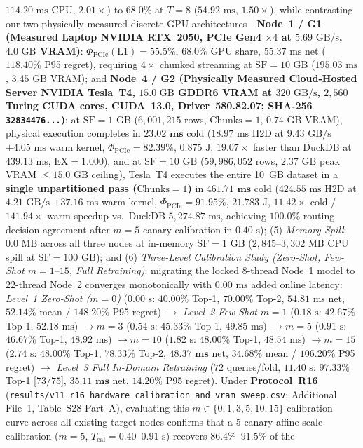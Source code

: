 \documentclass[10pt,a4paper]{article}
\begin{document}
\begin{enumerate}[leftmargin=1.5em,itemsep=0.8pt]
$114.20\text{ ms}$ CPU, $2.01\times$) to $68.0\%$ at $T=8$ ($54.92\text{ ms}$, $1.50\times$), while contrasting our two physically measured discrete GPU architectures---\textbf{Node~1 / G1 (Measured Laptop NVIDIA RTX~2050, PCIe Gen4 $\times 4$ at $5.69\text{ GB/s}$, $4.0\text{ GB}$ VRAM)}: $\Phi_{\text{PCIe}}(\text{L1})=55.5\%$, $68.0\%$ GPU share, $55.37\text{ ms}$ net ($118.40\%$ P95 regret), requiring $4\times$ chunked streaming at $\text{SF}=10\text{ GB}$ ($195.03\text{ ms}$, $3.45\text{ GB}$ VRAM); and \textbf{Node~4 / G2 (Physically Measured Cloud-Hosted Server NVIDIA Tesla~T4, $15.0\text{ GB}$ GDDR6 VRAM at $320\text{ GB/s}$, $2{,}560$ Turing CUDA cores, CUDA~13.0, Driver~580.82.07; SHA-256 \texttt{32834476...})}: at $\text{SF}=1\text{ GB}$ ($6{,}001{,}215$ rows, $\text{Chunks}=1$, $0.74\text{ GB}$ VRAM), physical execution completes in $\mathbf{23.02\text{ ms}}$ cold ($18.97\text{ ms}$ H2D at $9.43\text{ GB/s}$ $+ 4.05\text{ ms}$ warm kernel, $\Phi_{\text{PCIe}}=82.39\%$, $0.875\text{ J}$, $\mathbf{19.07\times}$ faster than DuckDB at $439.13\text{ ms}$, $\text{EX}=1.000$), and at $\text{SF}=10\text{ GB}$ ($59{,}986{,}052$ rows, $2.37\text{ GB}$ peak VRAM $\le 15.0\text{ GB}$ ceiling), Tesla~T4 executes the entire 10~GB dataset in a \textbf{single unpartitioned pass ($\text{Chunks}=1$)} in $\mathbf{461.71\text{ ms}}$ cold ($424.55\text{ ms}$ H2D at $4.21\text{ GB/s}$ $+ 37.16\text{ ms}$ warm kernel, $\Phi_{\text{PCIe}}=91.95\%$, $21.783\text{ J}$, $\mathbf{11.42\times}$ cold / $\mathbf{141.94\times}$ warm speedup vs.\ DuckDB $5{,}274.87\text{ ms}$, achieving $\mathbf{100.0\%}$ routing decision agreement after $m=5$ canary calibration in $0.40\text{ s}$); (5) \emph{Memory Spill}: $0.0\text{ MB}$ across all three nodes at in-memory $\text{SF}=1\text{ GB}$ ($2{,}845\text{--}3{,}302\text{ MB}$ CPU spill at $\text{SF}=100\text{ GB}$); and (6) \emph{Three-Level Calibration Study (Zero-Shot, Few-Shot $m=1\text{--}15$, Full Retraining)}: migrating the locked $8$-thread Node~1 model to $22$-thread Node~2 converges monotonically with $0.00\text{ ms}$ added online latency: \emph{Level~1 Zero-Shot ($m=0$)} ($0.00\text{ s}$: $40.00\%$ Top-1, $70.00\%$ Top-2, $54.81\text{ ms}$ net, $52.14\%$ mean / $148.20\%$ P95 regret) $\rightarrow$ \emph{Level~2 Few-Shot} $m=1$ ($0.18\text{ s}$: $42.67\%$ Top-1, $52.18\text{ ms}$) $\rightarrow m=3$ ($0.54\text{ s}$: $45.33\%$ Top-1, $49.85\text{ ms}$) $\rightarrow m=5$ ($0.91\text{ s}$: $46.67\%$ Top-1, $48.92\text{ ms}$) $\rightarrow m=10$ ($1.82\text{ s}$: $48.00\%$ Top-1, $48.54\text{ ms}$) $\rightarrow m=15$ ($2.74\text{ s}$: $48.00\%$ Top-1, $78.33\%$ Top-2, $\mathbf{48.37\text{ ms}}$ net, $34.68\%$ mean / $106.20\%$ P95 regret) $\rightarrow$ \emph{Level~3 Full In-Domain Retraining} ($72$ queries/fold, $11.40\text{ s}$: $\mathbf{97.33\%}$ Top-1 [$73/75$], $\mathbf{35.11\text{ ms}}$ net, $14.20\%$ P95 regret). Under \textbf{Protocol~R16} (\texttt{results/v11\_r16\_hardware\_calibration\_and\_vram\_sweep.csv}; Additional File~1, Table~S28 Part~A), evaluating this $m \in \{0, 1, 3, 5, 10, 15\}$ calibration curve across all existing target nodes confirms that a 5-canary affine scale calibration ($m=5$, $T_{\text{cal}}=0.40\text{--}0.91\text{ s}$) recovers $\mathbf{86.4\%\text{--}91.5\%}$ of the 
\end{enumerate}
\end{document}
